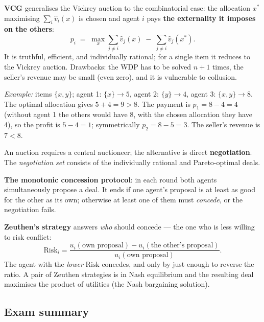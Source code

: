\documentclass[11pt,a4paper]{article}
\theoremstyle{definition}
\begin{document}
\begin{defbox}
\textbf{VCG} generalises the Vickrey auction to the combinatorial case: the allocation $x^*$
maximising $\sum_i \hat v_i(x)$ is chosen and agent $i$ pays \textbf{the externality it imposes
on the others}:
\[
p_i \;=\; \max_{x} \sum_{j \ne i} \hat v_j(x) \;-\; \sum_{j \ne i} \hat v_j(x^*) .
\]
It is truthful, efficient, and individually rational; for a single item it reduces to the
Vickrey auction. Drawbacks: the WDP has to be solved $n{+}1$ times, the seller's revenue may be
small (even zero), and it is vulnerable to collusion.

\emph{Example:} items $\{x,y\}$; agent 1: $\{x\}\to5$, agent 2: $\{y\}\to4$,
agent 3: $\{x,y\}\to8$. The optimal allocation gives $5+4=9 > 8$. The payment is
$p_1 = 8 - 4 = 4$ (without agent 1 the others would have 8, with the chosen allocation they have
4), so the profit is $5-4=1$; symmetrically $p_2 = 8-5 = 3$. The seller's revenue is $7 < 8$.
\end{defbox}

\begin{defbox}
An auction requires a central auctioneer; the alternative is direct \textbf{negotiation}.
The \emph{negotiation set} consists of the individually rational and Pareto-optimal deals.

\textbf{The monotonic concession protocol}: in each round both agents simultaneously propose a
deal. It ends if one agent's proposal is at least as good for the other as its own; otherwise at
least one of them must \emph{concede}, or the negotiation fails.

\textbf{Zeuthen's strategy} answers \emph{who} should concede --- the one who is less willing to
risk conflict:
\[
\mathrm{Risk}_i = \frac{u_i(\text{own proposal}) - u_i(\text{the other's proposal})}
{u_i(\text{own proposal})} .
\]
The agent with the \emph{lower} $\mathrm{Risk}$ concedes, and only by just enough to reverse the
ratio. A pair of Zeuthen strategies is in Nash equilibrium and the resulting deal maximises the
product of utilities (the Nash bargaining solution).
\end{defbox}

\subsection{Exam summary}
\end{document}
